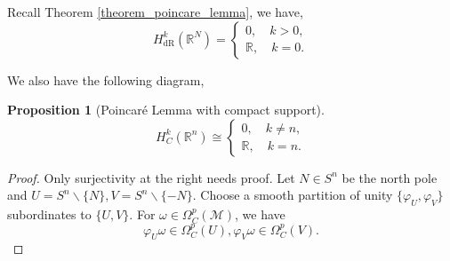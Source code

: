 \documentclass[8pt]{article}
\newtheorem{proposition}{Proposition}[section]
\DeclareMathOperator{\dR}{dR}
\newcommand{\R}[0]{\mathbb{R}}
\newcommand{\M}[0]{\mathcal{M}}
\begin{document}
Recall Theorem \ref{theorem_poincare_lemma}, we have,
\begin{equation*}
  H^k_{\dR}(\R^N)=\begin{cases}
    0,\quad k>0,\\
    \R, \quad k=0.
  \end{cases}
\end{equation*}

We also have the following diagram,

\begin{center}
\end{center}
\begin{proposition}[Poincaré Lemma with compact support]
  \begin{equation*}
    H_C^k(\R^n)\cong\begin{cases}
      0,\quad k\not=n,\\
      \R,\quad k=n.
    \end{cases}
  \end{equation*}
\end{proposition}

\begin{proof}
  Only surjectivity at the right needs proof. Let $N\in S^n$ be the north pole and $U=S^n\backslash \{N\},V=S^n\backslash \{-N\}$. Choose a smooth partition of unity $\{\varphi_U,\varphi_V\}$ subordinates to $\{U,V\}$. For $\omega\in\Omega^p_C(\M)$, we have 
  \begin{equation*}
    \varphi_U\omega\in\Omega_C^p(U),\varphi_V\omega\in\Omega_C^p(V).
  \end{equation*}
\end{proof}
\end{document}
